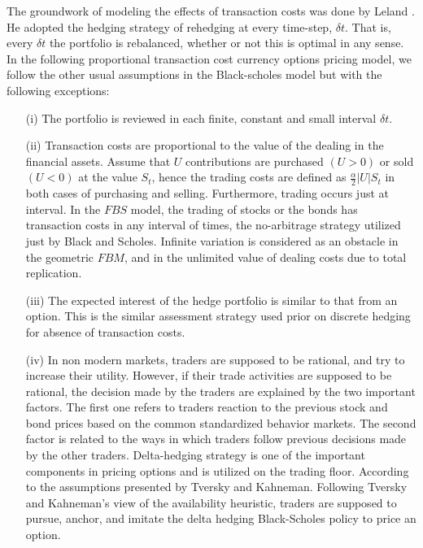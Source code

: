 \documentclass[a4paper,11pt]{amsart}
\numberwithin{equation}{section}
\theoremstyle{definition}
\theoremstyle{plain}
\theoremstyle{definition}
\newcommand{\1}{\mathbf{1}}
\begin{document}
The groundwork of modeling the effects of transaction costs was done by Leland \cite{leland}. He adopted the hedging strategy of
rehedging at every time-step, $\delta t$. That is, every $\delta t$ the portfolio is rebalanced, whether or not this is optimal in any sense. In the following proportional transaction cost currency options pricing model, we follow the other usual assumptions in the Black-scholes
model but with the following exceptions:



\begin{enumerate}


\item[(i)] The portfolio is reviewed in each finite, constant and small interval $\delta t$.

\item[(ii)] Transaction costs are proportional to the value of the dealing in the financial assets. Assume that $U$ contributions are purchased $(U>0)$ or sold $(U<0)$ at the value $S_t$, hence the trading costs are defined as $\frac{\alpha}{2}|U|S_t$  in both cases of purchasing and selling. Furthermore, trading occurs just at interval. In the $FBS$ model, the trading of stocks or the bonds has transaction costs in any interval of times, the no-arbitrage strategy utilized just by Black and Scholes. Infinite variation is considered as an obstacle in the geometric $FBM$, and in the  unlimited value of dealing costs due to total replication.
\item[(iii)] The expected interest of the hedge portfolio is similar to that from an option. This is the similar assessment strategy used prior on discrete hedging for absence of transaction costs.

\item[(iv)] In non modern markets, traders are supposed to be rational, and try to increase their utility. However, if their trade activities are supposed to be rational, the decision made by the traders are explained by the two important factors. The first one refers to traders reaction to the previous stock and bond prices based on the common standardized behavior  markets. The second factor is related to the ways in which traders follow previous decisions made by the other traders. Delta-hedging strategy is one of the important components in pricing options and is utilized on the trading floor. According to the assumptions presented by Tversky and Kahneman. Following  Tversky and Kahneman's \cite{tversky} view of the availability heuristic, traders are supposed to pursue, anchor, and imitate the delta hedging Black-Scholes policy to price an option.

\end{enumerate}
\end{document}
